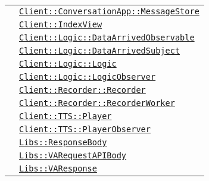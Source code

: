 \begin{longtable}{|>{\centering}m{3cm}|m{10cm}<{\centering}|}
& \hyperref[Client::ConversationApp::MessageStore]{\texttt{Client::ConversationApp::MessageStore}}\\
& \hyperref[Client::IndexView]{\texttt{Client::IndexView}}\\
& \hyperref[Client::Logic::DataArrivedObservable]{\texttt{Client::Logic::DataArrivedObservable}}\\
& \hyperref[Client::Logic::DataArrivedSubject]{\texttt{Client::Logic::DataArrivedSubject}}\\
& \hyperref[Client::Logic::Logic]{\texttt{Client::Logic::Logic}}\\
& \hyperref[Client::Logic::LogicObserver]{\texttt{Client::Logic::LogicObserver}}\\
& \hyperref[Client::Recorder::Recorder]{\texttt{Client::Recorder::Recorder}}\\
& \hyperref[Client::Recorder::RecorderWorker]{\texttt{Client::Recorder::RecorderWorker}}\\
& \hyperref[Client::TTS::Player]{\texttt{Client::TTS::Player}}\\
& \hyperref[Client::TTS::PlayerObserver]{\texttt{Client::TTS::PlayerObserver}}\\
& \hyperref[Libs::ResponseBody]{\texttt{Libs::ResponseBody}}\\
& \hyperref[Libs::VARequestAPIBody]{\texttt{Libs::VARequestAPIBody}}\\
& \hyperref[Libs::VAResponse]{\texttt{Libs::VAResponse}}\\ \hline


\end{longtable}
